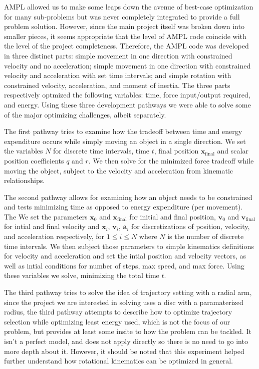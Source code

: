 \documentclass{report}
\begin{document}
AMPL allowed us to make some leaps down the avenue of best-case optimization for
many sub-problems but was never completely integrated to provide a full problem
solution. However, since the main project itself was broken down into smaller
pieces, it seems appropriate that the level of AMPL code coincide with the
level of the project completeness. Therefore, the AMPL code was developed in
three distinct parts: simple movement in one direction with constrained velocity
and no acceleration; simple movement in one direction with constrained velocity
and acceleration with set time intervals; and simple rotation with constrained
velocity, acceleration, and moment of inertia. The three parts respectively optmized the
following variables: time, force input/output required, and energy.
Using these three development pathways we were able to solve some of the major
optimizing challenges, albeit separately.

The first pathway tries to examine how the tradeoff between time and energy
expenditure occurs while simply moving an object in a single direction. We set
the variables $N$ for discrete time intervals, time $t$, final position $\mathbf{x}_\text{final}$
and
scalar position coefficients $q$ and $r$. We then solve for the minimized force
tradeoff while moving the object, subject to the velocity and acceleration from
kinematic relationships. 

The second pathway allows for examining how an object needs to be constrained 
and tests minimizing time as opposed to energy expenditure (per movement). The
We set the parameters $\mathbf{x}_0$ and $\mathbf{x}_\text{final}$ for initial and
final position, $\mathbf{v}_0$ and $\mathbf{v}_\text{final}$ for
intial and final velocity and $\mathbf{x}_i$, $\mathbf{v}_i$, $\mathbf{a}_i$
for discretizations of position,
velocity, and acceleration respectively, for $1 \leq i \leq N$ where $N$
is the number of discrete
time intervals. We then subject those parameters to simple kinematics definitions
for velocity and acceleration and set the intial position and velocity vectors,
as well as intial conditions for number of steps, max speed, and max force.
Using these variables we solve, minimizing the total time $t$. 

The third pathway tries to solve the idea of trajectory setting with a radial
arm, since the project we are interested in solving uses a disc with a
paramaterized radius, the third pathway attempts to describe how to optimize
trajectory selection while optimizing least energy used, which is not the focus
of our problem, but provides at least some insite to how the problem can be 
tackled. It isn't a perfect model, and does not apply directly so there is no
need to go into more depth about it. However, it should be noted that this
experiment helped further understand how rotational kinematics can be optimized
in general.
\end{document}
